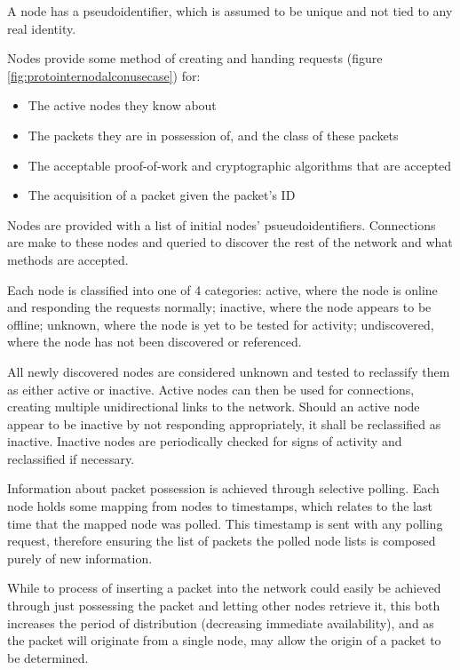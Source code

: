 A node has a pseudoidentifier, which is assumed to be unique and not tied to any real identity.

Nodes provide some method of creating and handing requests (figure \ref{fig:protointernodalconusecase}) for: 
\begin{itemize}[topsep=-5pt,itemsep=-1ex,partopsep=2ex,parsep=1.5ex]
	\item The active nodes they know about
	\item The packets they are in possession of, and the class of these packets
	\item The acceptable proof-of-work and cryptographic algorithms that are accepted
	\item The acquisition of a packet given the packet's ID
\end{itemize} \vspace{0.5ex}

Nodes are provided with a list of initial nodes' psueudoidentifiers. Connections are make to these nodes and queried to discover the rest of the network and what methods are accepted.

Each node is classified into one of 4 categories: active, where the node is online and responding the requests normally; inactive, where the node appears to be offline; unknown, where the node is yet to be tested for activity; undiscovered, where the node has not been discovered or referenced.

All newly discovered nodes are considered unknown and tested to reclassify them as either active or inactive. Active nodes can then be used for connections, creating multiple unidirectional links to the network. Should an active node appear to be inactive by not responding appropriately, it shall be reclassified as inactive. Inactive nodes are periodically checked for signs of activity and reclassified if necessary. 

Information about packet possession is achieved through selective polling. Each node holds some mapping from nodes to timestamps, which relates to the last time that the mapped node was polled. This timestamp is sent with any polling request, therefore ensuring the list of packets the polled node lists is composed purely of new information. 

While to process of inserting a packet into the network could easily be achieved through just possessing the packet and letting other nodes retrieve it, this both increases the period of distribution (decreasing immediate availability), and as the packet will originate from a single node, may allow the origin of a packet to be determined.

